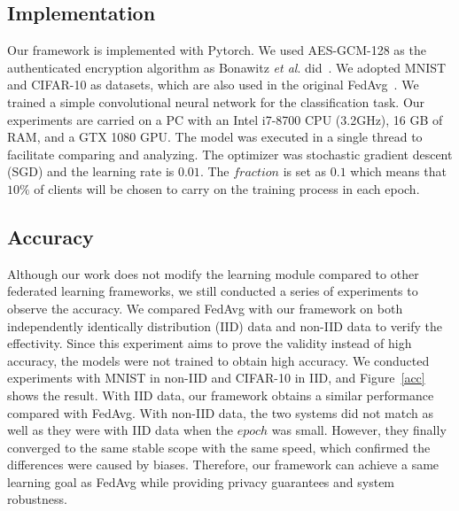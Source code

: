 \subsection{Implementation}
Our framework is implemented with Pytorch. We used AES-GCM-128 as the authenticated encryption algorithm as Bonawitz \emph{et al}. did~\cite{Practical}. We adopted MNIST and CIFAR-10 as datasets, which are also used in the original FedAvg~\cite{mcmahan2016communicationefficient}. We trained a simple convolutional neural network for the classification task. Our experiments are carried on a PC with an Intel i7-8700 CPU (3.2GHz), 16 GB of RAM, and a GTX 1080 GPU. The model was executed in a single thread to facilitate comparing and analyzing. The optimizer was stochastic gradient descent (SGD) and the learning rate is $0.01$. The $fraction$ is set as $0.1$ which means that $10\%$ of clients will be chosen to carry on the training process in each epoch. 


\subsection{Accuracy}
Although our work does not modify the learning module compared to other federated learning frameworks, we still conducted a series of experiments to observe the accuracy. We compared FedAvg with our framework on both independently identically distribution (IID) data and non-IID data to verify the effectivity. Since this experiment aims to prove the validity instead of high accuracy, the models were not trained to obtain high accuracy. We conducted experiments with MNIST in non-IID and CIFAR-10 in IID, and Figure~\ref{acc} shows the result. With IID data, our framework obtains a similar performance compared with FedAvg. With non-IID data, the two systems did not match as well as they were with IID data when the $epoch$ was small. However, they finally converged to the same stable scope with the same speed, which confirmed the differences were caused by biases. Therefore, our framework can achieve a same learning goal as FedAvg while providing privacy guarantees and system robustness.

